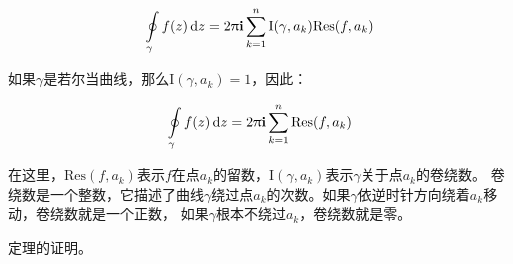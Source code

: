 	\begin{equation}
	\label{eq:res}
	\ointop_{\gamma}f(z)\,\mathrm{d}z=2\uppi\mathbf{i}\sum^n_{k=1}\mathrm{I}(\gamma,a_k)\mathrm{Res}(f,a_k)
	\end{equation}
	
	如果$\gamma$是若尔当曲线，那么$\mathrm{I}(\gamma,a_k)=1$，因此：
	
	\begin{equation}
	\label{eq:resthm}
	\ointop_{\gamma}f(z)\,\mathrm{d}z=2\uppi\mathbf{i}\sum^n_{k=1}\mathrm{Res}(f,a_k)
	\end{equation}
	
	
	在这里，$\mathrm{Res}(f,a_k)$表示$f$在点$a_k$的留数，$\mathrm{I}(\gamma,a_k)$表示$\gamma$关于点$a_k$的卷绕数。
	卷绕数是一个整数，它描述了曲线$\gamma$绕过点$a_k$的次数。如果$\gamma$依逆时针方向绕着$a_k$移动，卷绕数就是一个正数，
	如果$\gamma$根本不绕过$a_k$，卷绕数就是零。
	
	定理的证明。
	
%		
%		

\zhlipsum[6-20][name=zhufu]

\zhlipsum[21-40][name=zhufu]

\zhlipsum[41-70][name=zhufu]